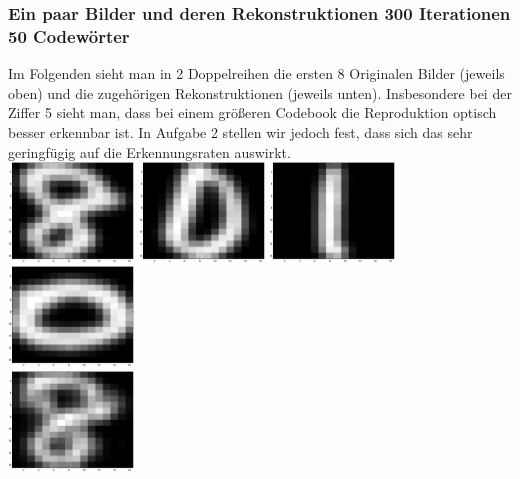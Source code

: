 \documentclass{article}
\begin{document}
\subsubsection*{Ein paar Bilder und deren Rekonstruktionen 300 Iterationen 50 Codewörter}
Im Folgenden sieht man in 2 Doppelreihen die ersten 8 Originalen
Bilder (jeweils oben) und die zugehörigen Rekonstruktionen (jeweils
unten). Insbesondere bei der Ziffer 5 sieht man, dass bei einem
größeren Codebook die Reproduktion optisch besser erkennbar ist. In
Aufgabe 2 stellen wir jedoch fest, dass sich das sehr geringfügig auf
die Erkennungsraten auswirkt.
\\
\includegraphics[width=0.25\textwidth]{50digits1.eps}\hspace{0.03\textwidth}%
\includegraphics[width=0.25\textwidth]{50digits2.eps}\hspace{0.03\textwidth}%
\includegraphics[width=0.25\textwidth]{50digits3.eps}\hspace{0.03\textwidth}%
\includegraphics[width=0.25\textwidth]{50digits4.eps}\\[1em]
\includegraphics[width=0.25\textwidth]{50reconst1.eps}\hspace{0.03\textwidth}%
\end{document}
